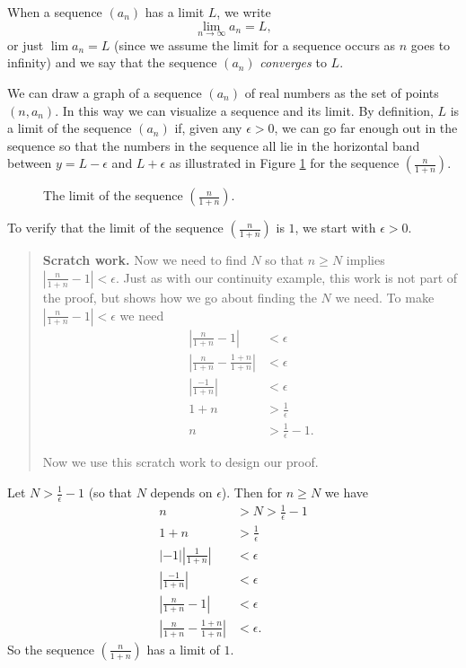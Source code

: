 When a sequence $(a_n)$ has a limit $L$, we write 
\[\lim_{n \to \infty} a_n = L,\]
or just $\lim a_n = L$ (since we assume the limit for a sequence occurs as $n$ goes to infinity) and we say that the sequence $(a_n)$ \emph{converges} to $L$.

\begin{example} We can draw a graph of a sequence $(a_n)$ of real numbers as the set of points $(n,a_n)$. In this way we can visualize a sequence and its limit. By definition, $L$ is a limit of the sequence $(a_n)$ if, given any $\epsilon > 0$, we can go far enough out in the sequence so that the numbers in the sequence all lie in the horizontal band between $y = L -\epsilon$ and $L+ \epsilon$ as illustrated in Figure \ref{F:sequence_limit} for the sequence $\left(\frac{n}{1+n}\right)$. 
\begin{figure}[h]
\begin{center}
\caption{The limit of the sequence $\left(\frac{n}{1+n}\right)$.} 
\label{F:sequence_limit}
\end{center}
\end{figure}
To verify that the limit of the sequence $\left(\frac{n}{1+n}\right)$ is $1$, we start with $\epsilon > 0$. 

\begin{quote} \textbf{Scratch work.} Now we need to find $N$ so that $n \geq N$ implies $\left| \frac{n}{1+n} - 1 \right| < \epsilon$. Just as with our continuity example, this work is not part of the proof, but shows how we go about finding the $N$ we need. To make $\left| \frac{n}{1+n} - 1 \right| < \epsilon$ we need
\begin{align*}
\left| \frac{n}{1+n} - 1 \right| &< \epsilon \\
\left| \frac{n}{1+n} - \frac{1+n}{1+n}  \right| &< \epsilon \\
\left| \frac{-1}{1+n} \right| &< \epsilon \\
1+n &> \frac{1}{\epsilon} \\
n &> \frac{1}{\epsilon} -1.
\end{align*}

Now we use this scratch work to design our proof. 
\end{quote}

Let $N > \frac{1}{\epsilon} -1$ (so that $N$ depends on $\epsilon$). Then for $n \geq N$ we have 
\begin{align*}
n &> N > \frac{1}{\epsilon} -1 \\
1+n &> \frac{1}{\epsilon} \\
|-1| \left| \frac{1}{1+n} \right| &< \epsilon \\
\left| \frac{-1}{1+n} \right| &< \epsilon \\
\left| \frac{n}{1+n} - 1 \right| &< \epsilon \\
\left| \frac{n}{1+n} - \frac{1+n}{1+n}  \right| &< \epsilon.
\end{align*}
So the sequence $\left(\frac{n}{1+n}\right)$ has a limit of $1$.
\end{example}

